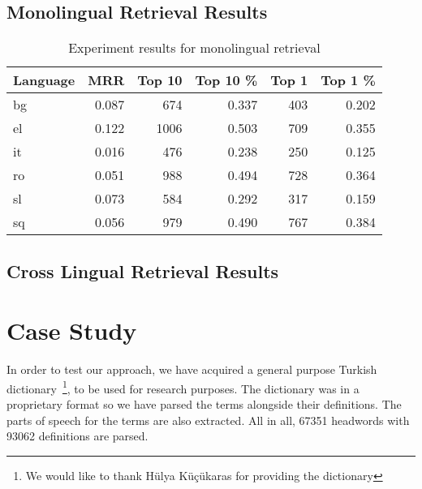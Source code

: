 \subsection{Monolingual Retrieval Results}%
\label{sub:chap4_results}

\begin{table}[htbp]
    \centering
    \begin{tabular}{lrrrrr}
        \toprule%
        Language & MRR & Top 10 & Top 10 \% & Top 1 & Top 1 \% \\
        \midrule%
        bg & 0.087 & 674 & 0.337 & 403 & 0.202 \\
        el & 0.122 & 1006 & 0.503 & 709 & 0.355 \\
        it & 0.016 & 476 & 0.238 & 250 & 0.125 \\
        ro & 0.051 & 988 & 0.494 & 728 & 0.364 \\
        sl & 0.073 & 584 & 0.292 & 317 & 0.159 \\
        sq & 0.056 & 979 & 0.490 & 767 & 0.384 \\
        \bottomrule
    \end{tabular}
    \caption{Experiment results for monolingual retrieval}%
    \label{tab:monolingual_tfidf}
\end{table}

\subsection{Cross Lingual Retrieval Results}%
\label{sub:cross_lingual_retrieval_results}


\section{Case Study}%
\label{sec:case_study}

In order to test our approach, we have acquired a general purpose Turkish dictionary~\footnote{We would like to thank Hülya Küçükaras for providing the dictionary}, to be used for research purposes.
The dictionary was in a proprietary format so we have parsed the terms alongside their definitions.
The parts of speech for the terms are also extracted.
All in all, 67351 headwords with 93062 definitions are parsed.

